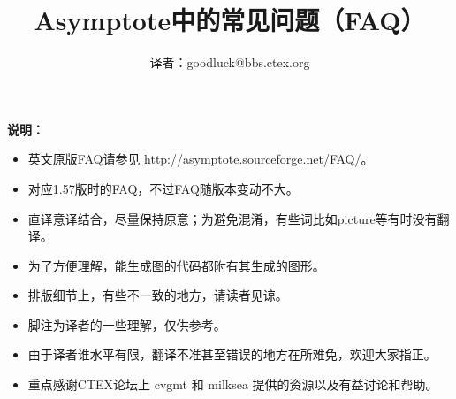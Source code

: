 %  
%  
%  
%  

\usepackage{hyperref}
\usepackage{graphicx}
\usepackage{wasysym}

\setlength{\deffboxsep}{\fboxsep}

\newcommand{\qref}[1]{~\framebox{\bfseries 问题\ref{#1}}~}
\newcommand{\myfig}[1]{\par{ \setlength{\fboxsep}{0pt}
     \centering\colorbox{yellow!10!white}{
     \parbox{0.9\textwidth}{\vspace{-2mm}\begin{center}\colorbox{white}{\texttt{[image: figures/\#1]}}\end{center}\vspace{-2mm}}
     }\\\rule{0.92\textwidth}{0.3pt}\\[-3mm]
     \setlength{\fboxsep}{\deffboxsep} }}

\title{\bfseries Asymptote中的常见问题（FAQ）}
\author{译者：goodluck@bbs.ctex.org}
\maketitle
\begin{center}
\colorbox{gray!30!white}{\parbox{0.9\textwidth}{
{\bfseries 说明：}
\begin{itemize}
\item 英文原版FAQ请参见 \url{http://asymptote.sourceforge.net/FAQ/}。
\item 对应1.57版时的FAQ，不过FAQ随版本变动不大\raisebox{-1pt}{\Large\smiley}。
\item 直译意译结合，尽量保持原意；为避免混淆，有些词比如picture等有时没有翻译。
\item 为了方便理解，能生成图的代码都附有其生成的图形。
\item 排版细节上，有些不一致的地方，请读者见谅。
\item 脚注为译者的一些理解，仅供参考。
\item 由于译者谁水平有限，翻译不准甚至错误的地方在所难免，欢迎大家指正。
\item 重点感谢CTEX论坛上 cvgmt 和 milksea 提供的资源以及有益讨论和帮助。
\end{itemize}
}}
\end{center}

